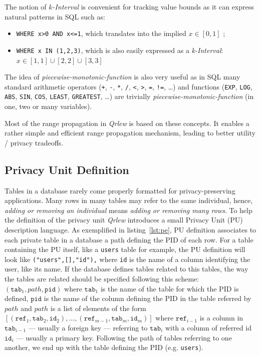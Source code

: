 \documentclass{article}
\newcommand{\qrlew}{\emph{Qrlew}}
\begin{document}
    The notion of \emph{$k$-Interval} is convenient for tracking value bounds as it can express natural patterns in SQL such as:
    \begin{itemize}
        \item \texttt{WHERE x>0 AND x<=1}, which translates into the implied $x\in \left[0, 1\right]$ ;
        \item \texttt{WHERE x IN (1,2,3)}, which is also easily expressed as a \emph{k-Interval}: $x \in \left[1, 1\right] \cup \left[2, 2\right] \cup \left[3, 3\right]$
    \end{itemize}
    
    The idea of \emph{piecewise-monotonic-function} is also very useful as in SQL many standard arithmetic operators (\texttt{+}, \texttt{-}, \texttt{*}, \texttt{/}, \texttt{<}, \texttt{>}, \texttt{=}, \texttt{!=}, \ldots) and functions (\texttt{EXP}, \texttt{LOG}, \texttt{ABS}, \texttt{SIN}, \texttt{COS}, \texttt{LEAST}, \texttt{GREATEST}, \ldots) are trivially \emph{piecewise-monotonic-function} (in one, two or many variables).
    
    Most of the range propagation in \qrlew{} is based on these concepts. It enables a rather simple and efficient range propagation mechanism, leading to better utility / privacy tradeoffs.
    
    \subsection{Privacy Unit Definition}
    \label{sec:privacy_unit_definition}
    
    Tables in a database rarely come properly formatted for privacy-preserving applications. Many rows in many tables may refer to the same individual, hence, \emph{adding or removing an individual} means \emph{adding or removing many rows}. To help the definition of the privacy unit \qrlew{} introduces a small Privacy Unit (PU) description language.
    As exemplified in listing~\ref{lst:pe}, PU definition associates to each private table in a database a path defining the PID of each row. For a table containing the PU itself, like a \texttt{users} table for example, the PU definition will look like \texttt{("users",[],"id"),} where \texttt{id} is the name of a column identifying the user, like its name. If the database defines tables related to this tables, the way the tables are related should be specified following this scheme: $(\mathtt{tab}_1, path, \mathtt{pid})$ where $\mathtt{tab}_1$ is the name of the table for which the PID is defined, $\mathtt{pid}$ is the name of the column defining the PID in the table referred by $path$ and $path$ is a list of elements of the form $[(\mathtt{ref}_1, \mathtt{tab}_2, \mathtt{id}_2),\ldots, (\mathtt{ref}_{m-1}, \mathtt{tab}_m, \mathtt{id}_m)]$
    where $\mathtt{ref}_{i-1}$ is a column in $\mathtt{tab}_{i-1}$ --- usually a foreign key --- referring to $\mathtt{tab}_i$ with a column of referred id $\mathtt{id}_i$ --- usually a primary key. Following the path of tables referring to one another, we end up with the table defining the PID (e.g. \texttt{users}).
    
\end{document}
